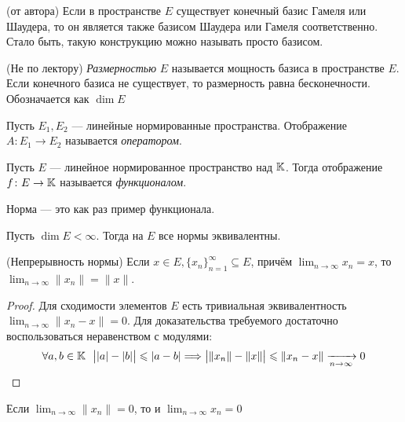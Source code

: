 \begin{proposition} (от автора)
	Если в пространстве $E$ существует конечный базис Гамеля или Шаудера, то он является также базисом Шаудера или Гамеля соответственно. Стало быть, такую конструкцию можно называть просто базисом.
\end{proposition}

\begin{definition} (Не по лектору)
	\textit{Размерностью} $E$ называется мощность базиса в пространстве $E$. Если конечного базиса не существует, то размерность равна бесконечности. Обозначается как $\dim E$
\end{definition}

\begin{definition}
	Пусть $E_1, E_2$ --- линейные нормированные пространства. Отображение $A \colon E_1 \to E_2$ называется \textit{оператором}.
\end{definition}

\begin{definition}
	Пусть $E$ --- линейное нормированное пространство над $\mathbb{K}$. Тогда отображение $f \colon E \to \mathbb{K}$ называется \textit{функционалом}.
\end{definition}

\begin{anote}
	Норма --- это как раз пример функционала.
\end{anote}

\begin{theorem}
	Пусть $\dim E < \infty$. Тогда на $E$ все нормы эквивалентны.
\end{theorem}

\begin{lemma} (Непрерывность нормы)
	Если $x \in E, \{x_n\}_{n = 1}^\infty \subseteq E$, причём $\lim_{n \to \infty} x_n = x$, то $\lim_{n \to \infty} \|x_n\| = \|x\|$.
\end{lemma}

\begin{proof}
	Для сходимости элементов $E$ есть тривиальная эквивалентность \\ $\lim_{n \to \infty} \|x_n - x\| = 0$. Для доказательства требуемого достаточно воспользоваться неравенством с модулями:
	\[
		\forall a, b \in \mathbb{K}\ \ \big||a| - |b|\big| \leqslant |a - b| \Longrightarrow \big|\|x_n\| - \|x\|\big| \leqslant \|x_n - x\| \xrightarrow[n \to \infty]{} 0
	\]
\end{proof}

\begin{corollary}
	Если $\lim_{n \to \infty} \|x_n\| = 0$, то и $\lim_{n \to \infty} x_n = 0$
\end{corollary}

